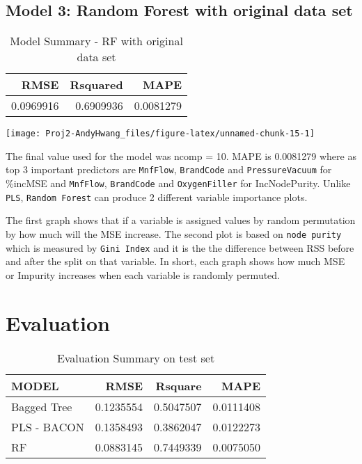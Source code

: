 \documentclass[]{report}
\begin{document}
\section{Model 3: Random Forest with original data
set}\label{model-3-random-forest-with-original-data-set}

\begin{table}[H]

\caption{\label{tab:unnamed-chunk-15}Model Summary - RF with original data set}
\centering
\fontsize{8}{10}\selectfont
\begin{tabular}[t]{rrr}
\toprule
\textbf{RMSE} & \textbf{Rsquared} & \textbf{MAPE}\\
\midrule
\rowcolor{gray!6}  0.0969916 & 0.6909936 & 0.0081279\\
\bottomrule
\end{tabular}
\end{table}

\begin{center}\texttt{[image: Proj2-AndyHwang\_files/figure-latex/unnamed-chunk-15-1]} \end{center}

The final value used for the model was ncomp = 10. MAPE is 0.0081279
where as top 3 important predictors are \texttt{MnfFlow},
\texttt{BrandCode} and \texttt{PressureVacuum} for \%incMSE and
\texttt{MnfFlow}, \texttt{BrandCode} and \texttt{OxygenFiller} for
IncNodePurity. Unlike \texttt{PLS}, \texttt{Random\ Forest} can produce
2 different variable importance plots.

The first graph shows that if a variable is assigned values by random
permutation by how much will the MSE increase. The second plot is based
on \texttt{node\ purity} which is measured by \texttt{Gini\ Index} and
it is the the difference between RSS before and after the split on that
variable. In short, each graph shows how much MSE or Impurity increases
when each variable is randomly permuted.

\chapter{Evaluation}\label{evaluation}

\begin{table}[H]

\caption{\label{tab:unnamed-chunk-16}Evaluation Summary on test set}
\centering
\fontsize{8}{10}\selectfont
\begin{tabular}[t]{lrrr}
\toprule
\textbf{MODEL} & \textbf{RMSE} & \textbf{Rsquare} & \textbf{MAPE}\\
\midrule
\rowcolor{gray!6}  Bagged Tree & 0.1235554 & 0.5047507 & 0.0111408\\
PLS - BACON & 0.1358493 & 0.3862047 & 0.0122273\\
\rowcolor{gray!6}  RF & 0.0883145 & 0.7449339 & 0.0075050\\
\bottomrule
\end{tabular}
\end{table}
\end{document}
